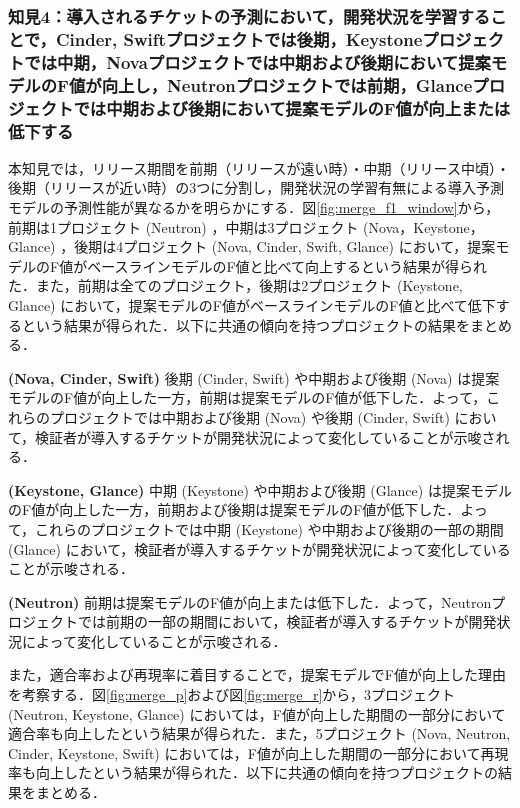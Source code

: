 \documentclass[11pt]{jreport}
\begin{document}
\subsubsection{知見4：導入されるチケットの予測において，開発状況を学習することで，Cinder, Swiftプロジェクトでは後期，Keystoneプロジェクトでは中期，Novaプロジェクトでは中期および後期において提案モデルのF値が向上し，Neutronプロジェクトでは前期，Glanceプロジェクトでは中期および後期において提案モデルのF値が向上または低下する}
本知見では，リリース期間を前期（リリースが遠い時）・中期（リリース中頃）・後期（リリースが近い時）の3つに分割し，開発状況の学習有無による導入予測モデルの予測性能が異なるかを明らかにする．図\ref{fig:merge_f1_window}から，前期は1プロジェクト (Neutron) ，中期は3プロジェクト (Nova，Keystone，Glance) ，後期は4プロジェクト (Nova, Cinder, Swift, Glance) において，提案モデルのF値がベースラインモデルのF値と比べて向上するという結果が得られた．また，前期は全てのプロジェクト，後期は2プロジェクト (Keystone, Glance) において，提案モデルのF値がベースラインモデルのF値と比べて低下するという結果が得られた．以下に共通の傾向を持つプロジェクトの結果をまとめる．

\textbf{ (Nova, Cinder, Swift) }後期 (Cinder, Swift) や中期および後期 (Nova) は提案モデルのF値が向上した一方，前期は提案モデルのF値が低下した．よって，これらのプロジェクトでは中期および後期 (Nova) や後期 (Cinder, Swift) において，検証者が導入するチケットが開発状況によって変化していることが示唆される．

\textbf{ (Keystone, Glance) }中期 (Keystone) や中期および後期 (Glance) は提案モデルのF値が向上した一方，前期および後期は提案モデルのF値が低下した．よって，これらのプロジェクトでは中期 (Keystone) や中期および後期の一部の期間 (Glance) において，検証者が導入するチケットが開発状況によって変化していることが示唆される．

\textbf{ (Neutron) }前期は提案モデルのF値が向上または低下した．よって，Neutronプロジェクトでは前期の一部の期間において，検証者が導入するチケットが開発状況によって変化していることが示唆される．

また，適合率および再現率に着目することで，提案モデルでF値が向上した理由を考察する．図\ref{fig:merge_p}および図\ref{fig:merge_r}から，3プロジェクト (Neutron, Keystone, Glance) においては，F値が向上した期間の一部分において適合率も向上したという結果が得られた．また，5プロジェクト (Nova, Neutron, Cinder, Keystone, Swift) においては，F値が向上した期間の一部分において再現率も向上したという結果が得られた．以下に共通の傾向を持つプロジェクトの結果をまとめる．
\end{document}
